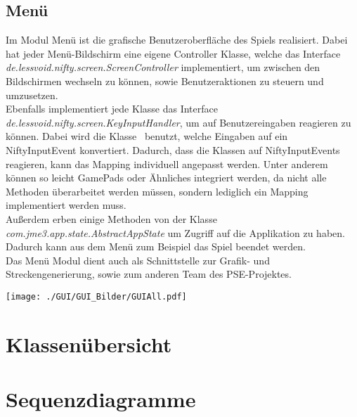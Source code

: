 \documentclass[parskip=full]{scrartcl}
\begin{document}
		\pagebreak
			
		\subsection{Menü}
			
			Im Modul Menü ist die grafische Benutzeroberfläche des Spiels realisiert. 
			Dabei hat jeder Menü-Bildschirm eine eigene Controller Klasse, welche das 
			Interface \textit{de.lessvoid.nifty.screen.ScreenController} implementiert, 
			um zwischen den Bildschirmen wechseln zu können, sowie Benutzeraktionen zu 
			steuern und umzusetzen. \\
			Ebenfalls implementiert jede Klasse das Interface 
			\textit{de.lessvoid.nifty.screen.KeyInputHandler}, um auf Benutzereingaben 
			reagieren zu können. Dabei wird die Klasse~ benutzt, welche 
			Eingaben auf ein NiftyInputEvent konvertiert. Dadurch, dass die Klassen auf
			NiftyInputEvents reagieren, kann das Mapping individuell angepasst werden. 
			Unter anderem können so leicht GamePads oder Ähnliches integriert werden, 
			da nicht alle Methoden überarbeitet werden müssen, sondern lediglich ein 
			Mapping implementiert werden muss. \\
			Außerdem erben einige Methoden von der Klasse 
			\textit{com.jme3.app.state.AbstractAppState} um Zugriff auf die Applikation 
			zu haben. Dadurch kann aus dem Menü zum Beispiel das Spiel beendet werden. \\
			Das Menü Modul dient auch als Schnittstelle zur Grafik- und Streckengenerierung,
			sowie zum anderen Team des PSE-Projektes. \par

			\begin{center}
				\texttt{[image: ./GUI/GUI\_Bilder/GUIAll.pdf]}
				\label{fig:menu}
			\end{center}

	\pagebreak
	
	\section{Klassenübersicht}
	
		
		
		
		
		
	\pagebreak
	
	\section{Sequenzdiagramme}
\end{document}
